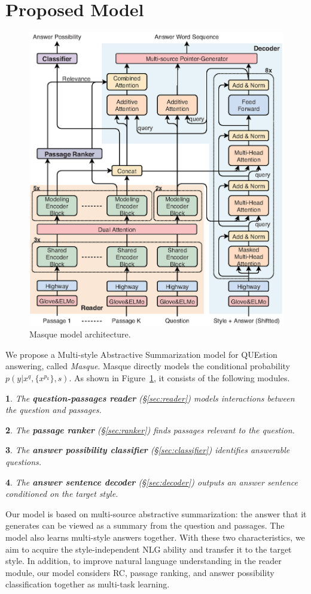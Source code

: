 \documentclass[11pt,a4paper]{article}
\theoremstyle{mydef}
\theoremstyle{myprob}
\newtheorem{layer1}{}
\begin{document}
\section{Proposed Model} 

\begin{figure}[t!]
\centering
\includegraphics[width=.47\textwidth]{./images/Masque_model11.eps}
\caption{Masque model architecture.}
\label{fig:model}
\end{figure}

We propose a Multi-style Abstractive Summarization model for QUEstion answering, called \textit{Masque}.
Masque directly models the conditional probability $p(y|x^q, \{x^{p_k}\}, s)$.
As shown in Figure~\ref{fig:model}, it consists of the following modules.
\begin{layer1}
The \textbf{question-passages reader} (\S\ref{sec:reader}) models interactions between the question and passages.
\end{layer1}
\begin{layer1}
The \textbf{passage ranker} (\S\ref{sec:ranker}) finds passages relevant to the question.
\end{layer1}
\begin{layer1}
The \textbf{answer possibility classifier} (\S\ref{sec:classifier}) identifies answerable questions.
\end{layer1}
\begin{layer1}
The \textbf{answer sentence decoder} (\S\ref{sec:decoder}) outputs an answer sentence conditioned on the target style.
\end{layer1}

Our model is based on multi-source abstractive summarization: the answer that it generates can be viewed as a summary from the question and passages. 
The model also learns multi-style answers together.
With these two characteristics, we aim to acquire the style-independent NLG ability and transfer it to the target style.
In addition, to improve natural language understanding in the reader module, our model considers RC, passage ranking, and answer possibility classification together as multi-task learning.
\end{document}
